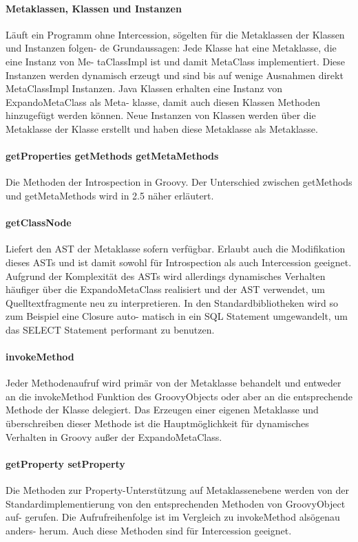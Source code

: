 \documentclass[11pt,english,ngerman, headsepline]{scrreprt}
\begin{document}
\paragraph{ Metaklassen, Klassen und Instanzen} Läuft ein Programm ohne
Intercession, sögelten für die Metaklassen der Klassen und Instanzen folgen- de
Grundaussagen: Jede Klasse hat eine Metaklasse, die eine Instanz von Me-
taClassImpl ist und damit MetaClass implementiert. Diese Instanzen werden
dynamisch erzeugt und sind bis auf wenige Ausnahmen direkt MetaClassImpl
Instanzen. Java Klassen erhalten eine Instanz von ExpandoMetaClass als Meta-
klasse, damit auch diesen Klassen Methoden hinzugefügt werden können. Neue
Instanzen von Klassen werden über die Metaklasse der Klasse erstellt und haben
diese Metaklasse als Metaklasse.




 
\paragraph{ getProperties getMethods getMetaMethods}
Die Methoden der Introspection in Groovy. Der Unterschied zwischen getMethods
und getMetaMethods wird in 2.5 näher erläutert.
\paragraph{ getClassNode}
Liefert den AST der Metaklasse sofern verfügbar. Erlaubt auch die Modifikation
dieses ASTs und ist damit sowohl für Introspection als auch Intercession
geeignet. Aufgrund der Komplexität des ASTs wird allerdings dynamisches
Verhalten häufiger über die ExpandoMetaClass realisiert und der AST verwendet,
um Quelltextfragmente neu zu interpretieren. In den Standardbibliotheken wird so
zum Beispiel eine Closure auto- matisch in ein SQL Statement umgewandelt, um das
SELECT Statement performant zu benutzen.
\paragraph{ invokeMethod}
Jeder Methodenaufruf wird primär von der Metaklasse behandelt und entweder an
die invokeMethod Funktion des GroovyObjects oder aber an die entsprechende
Methode der Klasse delegiert. Das Erzeugen einer eigenen Metaklasse und
überschreiben dieser Methode ist die Hauptmöglichkeit für dynamisches
Verhalten in Groovy außer der ExpandoMetaClass.
\paragraph{ getProperty setProperty}
Die Methoden zur Property-Unterstützung auf Metaklassenebene werden von der
Standardimplementierung von den entsprechenden Methoden von GroovyObject auf-
gerufen. Die Aufrufreihenfolge ist im Vergleich zu invokeMethod alsögenau
anders- herum. Auch diese Methoden sind für Intercession geeignet.
\end{document}
